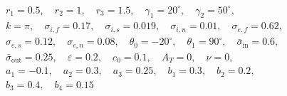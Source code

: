$$
\begin{gathered}
r_1 = 0.5,\quad r_2 = 1,\quad r_3 = 1.5,\quad \gamma_1 = 20^\circ,\quad \gamma_2 = 50^\circ,\\
k = \pi,\quad \sigma_{i,f} = 0.17,\quad \sigma_{i,s} = 0.019,\quad \sigma_{i,n} = 0.01,\quad \sigma_{e,f} = 0.62,\\
\sigma_{e,s} = 0.12,\quad \sigma_{e,n} = 0.08,\quad \theta_0 = -20^\circ,\quad \theta_1 = 90^\circ,\quad \bar\sigma_{\mathrm{in}} = 0.6,\\
\bar\sigma_{\mathrm{out}} = 0.25,\quad \varepsilon = 0.2,\quad c_0 = 0.1,\quad A_T = 0,\quad \nu = 0,\\
a_1 = -0.1,\quad a_2 = 0.3,\quad a_3 = 0.25,\quad b_1 = 0.3,\quad b_2 = 0.2,\\
b_3 = 0.4,\quad b_4 = 0.15
\end{gathered}
$$
